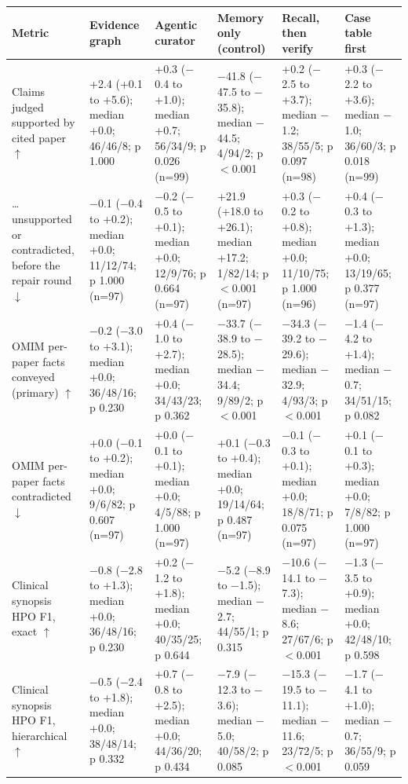 \documentclass{article} %
\begin{document}
\begin{table}
\begin{tabularx}{\linewidth}{>{\raggedright\arraybackslash}p{3.4cm}>{\centering\arraybackslash}X>{\centering\arraybackslash}X>{\centering\arraybackslash}X>{\centering\arraybackslash}X>{\centering\arraybackslash}X}
\toprule
Metric & Evidence graph & Agentic curator & Memory only (control) & Recall, then verify & Case table first \\
\midrule
Claims judged supported by cited paper $\uparrow$ & +2.4 (+0.1 to +5.6); median +0.0; 46/46/8; p 1.000 & +0.3 ($-$0.4 to +1.0); median +0.7; 56/34/9; p 0.026 (n=99) & $-$41.8 ($-$47.5 to $-$35.8); median $-$44.5; 4/94/2; p $<$0.001 & +0.2 ($-$2.5 to +3.7); median $-$1.2; 38/55/5; p 0.097 (n=98) & +0.3 ($-$2.2 to +3.6); median $-$1.0; 36/60/3; p 0.018 (n=99) \\
\ldots{} unsupported or contradicted, before the repair round $\downarrow$ & $-$0.1 ($-$0.4 to +0.2); median +0.0; 11/12/74; p 1.000 (n=97) & $-$0.2 ($-$0.5 to +0.1); median +0.0; 12/9/76; p 0.664 (n=97) & +21.9 (+18.0 to +26.1); median +17.2; 1/82/14; p $<$0.001 (n=97) & +0.3 ($-$0.2 to +0.8); median +0.0; 11/10/75; p 1.000 (n=96) & +0.4 ($-$0.3 to +1.3); median +0.0; 13/19/65; p 0.377 (n=97) \\
OMIM per-paper facts conveyed (primary) $\uparrow$ & $-$0.2 ($-$3.0 to +3.1); median +0.0; 36/48/16; p 0.230 & +0.4 ($-$1.0 to +2.7); median +0.0; 34/43/23; p 0.362 & $-$33.7 ($-$38.9 to $-$28.5); median $-$34.4; 9/89/2; p $<$0.001 & $-$34.3 ($-$39.2 to $-$29.6); median $-$32.9; 4/93/3; p $<$0.001 & $-$1.4 ($-$4.2 to +1.4); median $-$0.7; 34/51/15; p 0.082 \\
OMIM per-paper facts contradicted $\downarrow$ & +0.0 ($-$0.1 to +0.2); median +0.0; 9/6/82; p 0.607 (n=97) & +0.0 ($-$0.1 to +0.1); median +0.0; 4/5/88; p 1.000 (n=97) & +0.1 ($-$0.3 to +0.4); median +0.0; 19/14/64; p 0.487 (n=97) & $-$0.1 ($-$0.3 to +0.1); median +0.0; 18/8/71; p 0.075 (n=97) & +0.1 ($-$0.1 to +0.3); median +0.0; 7/8/82; p 1.000 (n=97) \\
Clinical synopsis HPO F1, exact $\uparrow$ & $-$0.8 ($-$2.8 to +1.3); median +0.0; 36/48/16; p 0.230 & +0.2 ($-$1.2 to +1.8); median +0.0; 40/35/25; p 0.644 & $-$5.2 ($-$8.9 to $-$1.5); median $-$2.7; 44/55/1; p 0.315 & $-$10.6 ($-$14.1 to $-$7.3); median $-$8.6; 27/67/6; p $<$0.001 & $-$1.3 ($-$3.5 to +0.9); median +0.0; 42/48/10; p 0.598 \\
Clinical synopsis HPO F1, hierarchical $\uparrow$ & $-$0.5 ($-$2.4 to +1.8); median +0.0; 38/48/14; p 0.332 & +0.7 ($-$0.8 to +2.5); median +0.0; 44/36/20; p 0.434 & $-$7.9 ($-$12.3 to $-$3.6); median $-$5.0; 40/58/2; p 0.085 & $-$15.3 ($-$19.5 to $-$11.1); median $-$11.6; 23/72/5; p $<$0.001 & $-$1.7 ($-$4.1 to +1.0); median $-$0.7; 36/55/9; p 0.059 \\

\end{tabularx}
\end{table}
\end{document}
